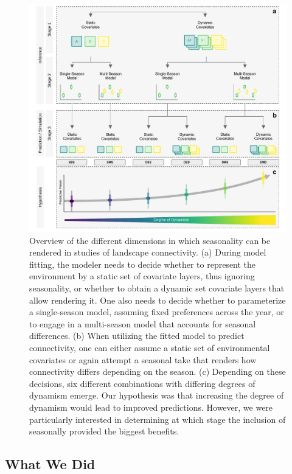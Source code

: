 \documentclass[abstract=on,10pt,a4paper,bibliography=totocnumbered]{article}
\begin{document}
\begin{figure}
 \begin{center}
  \includegraphics[width = \textwidth]{Figures/GraphicalAbstract.pdf}
  \caption{Overview of the different dimensions in which seasonality can be
  rendered in studies of landscape connectivity. (a) During model fitting, the
  modeler needs to decide whether to represent the environment by a static set
  of covariate layers, thus ignoring seasonality, or whether to obtain a dynamic
  set covariate layers that allow rendering it. One also needs to decide
  whether to parameterize a single-season model, assuming fixed preferences
  across the year, or to engage in a multi-season model that accounts for
  seasonal differences. (b) When utilizing the fitted model to predict
  connectivity, one can either assume a static set of environmental covariates
  or again attempt a seasonal take that renders how connectivity differs
  depending on the season. (c) Depending on these decisions, six different
  combinations with differing degrees of dynamism emerge. Our hypothesis was
  that increasing the degree of dynamism would lead to improved predictions.
  However, we were particularly interested in determining at which stage the
  inclusion of seasonally provided the biggest benefits.}
  \label{GraphicalAbstract}
 \end{center}
\end{figure}

\subsection{What We Did}
\end{document}
